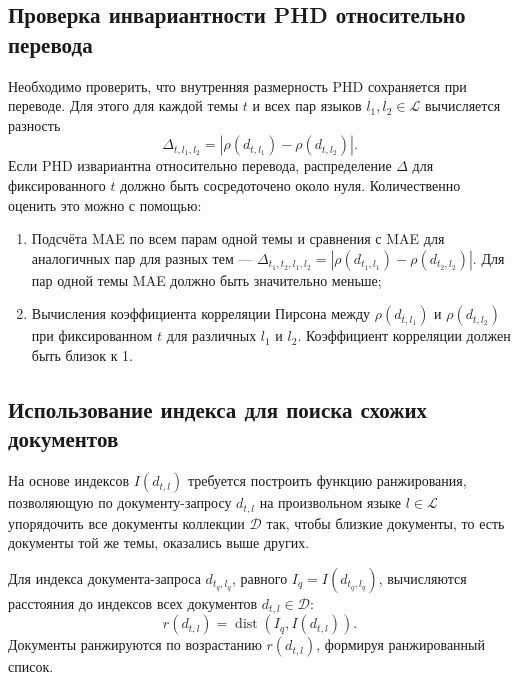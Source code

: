 \documentclass{article}
\begin{document}
\subsection{Проверка инвариантности PHD относительно перевода}

Необходимо проверить, что внутренняя размерность PHD сохраняется при переводе. Для этого для каждой темы \(t\) и всех пар языков $l_1, l_2 \in \mathcal{L}$ вычисляется разность
$$\Delta_{t, l_1, l_2} = \left| \rho(d_{t, l_1}) - \rho(d_{t, l_2}) \right|.$$
Если PHD извариантна относительно перевода, распределение \(\Delta\) для фиксированного $t$ должно быть сосредоточено около нуля. Количественно оценить это можно с помощью:
\begin{enumerate}
    \item Подсчёта MAE по всем парам одной темы и сравнения с MAE для аналогичных пар для разных тем --- $\Delta_{t_1, t_2, l_1, l_2} = \left| \rho(d_{t_1, l_1}) - \rho(d_{t_2, l_2}) \right|$. Для пар одной темы MAE должно быть значительно меньше;
    \item Вычисления коэффициента корреляции Пирсона между \(\rho(d_{t, l_1})\) и \(\rho(d_{t, l_2})\) при фиксированном \(t\) для различных $l_1$ и $l_2$. Коэффициент корреляции должен быть близок к 1.
\end{enumerate}

\subsection{Использование индекса для поиска схожих документов}

На основе индексов $I(d_{t, l})$ требуется построить функцию ранжирования, позволяющую по документу-запросу $d_{t, l}$ на произвольном языке $l \in \mathcal{L}$ упорядочить все документы коллекции $\mathcal{D}$ так, чтобы близкие документы, то есть документы той же темы, оказались выше других.

Для индекса документа-запроса $d_{t_q, l_q}$, равного $I_{q} = I(d_{t_q, l_q})$, вычисляются расстояния до индексов всех документов $d_{t, l} \in \mathcal{D}$:
$$r(d_{t, l}) = \operatorname{dist}\left( I_q, I(d_{t, l}) \right).$$
Документы ранжируются по возрастанию $r(d_{t, l})$, формируя ранжированный список.
\end{document}
